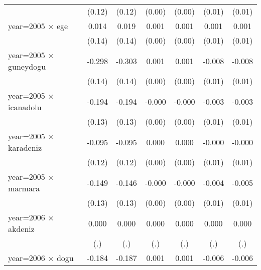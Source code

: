 {\begin{tabular}{l*{6}{c}}
                    &      (0.12)         &      (0.12)         &      (0.00)         &      (0.00)         &      (0.01)         &      (0.01)         \\
year=2005 $\times$ ege&       0.014         &       0.019         &       0.001         &       0.001         &       0.001         &       0.001         \\
                    &      (0.14)         &      (0.14)         &      (0.00)         &      (0.00)         &      (0.01)         &      (0.01)         \\
year=2005 $\times$ guneydogu&      -0.298\sym{*}  &      -0.303\sym{*}  &       0.001         &       0.001         &      -0.008         &      -0.008         \\
                    &      (0.14)         &      (0.14)         &      (0.00)         &      (0.00)         &      (0.01)         &      (0.01)         \\
year=2005 $\times$ icanadolu&      -0.194         &      -0.194         &      -0.000         &      -0.000         &      -0.003         &      -0.003         \\
                    &      (0.13)         &      (0.13)         &      (0.00)         &      (0.00)         &      (0.01)         &      (0.01)         \\
year=2005 $\times$ karadeniz&      -0.095         &      -0.095         &       0.000         &       0.000         &      -0.000         &      -0.000         \\
                    &      (0.12)         &      (0.12)         &      (0.00)         &      (0.00)         &      (0.01)         &      (0.01)         \\
year=2005 $\times$ marmara&      -0.149         &      -0.146         &      -0.000         &      -0.000         &      -0.004         &      -0.005         \\
                    &      (0.13)         &      (0.13)         &      (0.00)         &      (0.00)         &      (0.01)         &      (0.01)         \\
year=2006 $\times$ akdeniz&       0.000         &       0.000         &       0.000         &       0.000         &       0.000         &       0.000         \\
                    &         (.)         &         (.)         &         (.)         &         (.)         &         (.)         &         (.)         \\
year=2006 $\times$ dogu&      -0.184         &      -0.187         &       0.001         &       0.001         &      -0.006         &      -0.006         \\

\end{tabular}}

